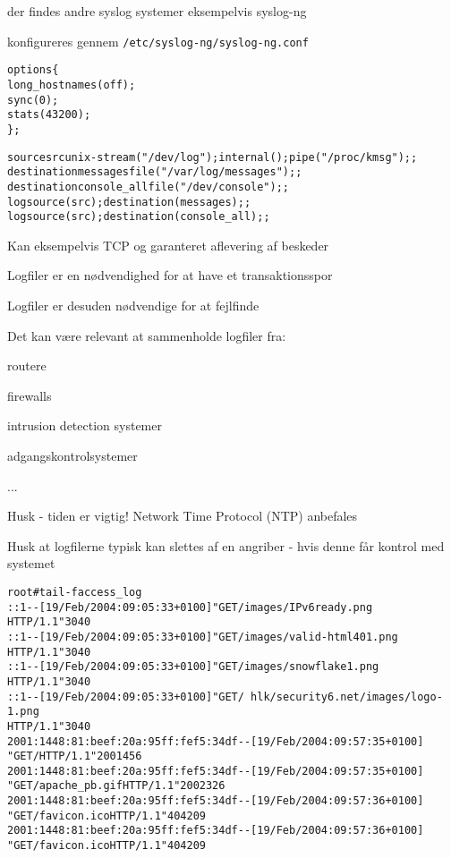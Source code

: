 \documentclass[Screen16to9,17pt]{foils}
\begin{document}

\begin{list2}
\item der findes andre syslog systemer eksempelvis syslog-ng
\item konfigureres gennem \verb+/etc/syslog-ng/syslog-ng.conf+
\end{list2}

\begin{alltt}
\small
options \{
        long_hostnames(off);
        sync(0);
        stats(43200);
\};

source src { unix-stream("/dev/log"); internal(); pipe("/proc/kmsg"); };
destination messages { file("/var/log/messages"); };
destination console_all { file("/dev/console"); };
log { source(src); destination(messages); };
log { source(src); destination(console_all); };
\end{alltt}
Kan eksempelvis TCP og garanteret aflevering af beskeder



\begin{list1}
\item Logfiler er en nødvendighed for at have et transaktionsspor
\item Logfiler er desuden nødvendige for at fejlfinde
\item Det kan være relevant at sammenholde logfiler fra:
\begin{list2}
\item routere
\item firewalls
\item intrusion detection systemer
\item adgangskontrolsystemer
\item ...
\end{list2}
\item Husk - tiden er vigtig! Network Time Protocol (NTP) anbefales
\item Husk at logfilerne typisk kan slettes af en angriber -
  hvis denne får kontrol med systemet
\end{list1}



\begin{alltt}
\footnotesize
root# tail -f access_log
::1 - - [19/Feb/2004:09:05:33 +0100] "GET /images/IPv6ready.png
HTTP/1.1" 304 0
::1 - - [19/Feb/2004:09:05:33 +0100] "GET /images/valid-html401.png
HTTP/1.1" 304 0
::1 - - [19/Feb/2004:09:05:33 +0100] "GET /images/snowflake1.png
HTTP/1.1" 304 0
::1 - - [19/Feb/2004:09:05:33 +0100] "GET /~hlk/security6.net/images/logo-1.png
HTTP/1.1" 304 0
2001:1448:81:beef:20a:95ff:fef5:34df - - [19/Feb/2004:09:57:35 +0100]
"GET / HTTP/1.1" 200 1456
2001:1448:81:beef:20a:95ff:fef5:34df - - [19/Feb/2004:09:57:35 +0100]
"GET /apache_pb.gif HTTP/1.1" 200 2326
2001:1448:81:beef:20a:95ff:fef5:34df - - [19/Feb/2004:09:57:36 +0100]
"GET /favicon.ico HTTP/1.1" 404 209
2001:1448:81:beef:20a:95ff:fef5:34df - - [19/Feb/2004:09:57:36 +0100]
"GET /favicon.ico HTTP/1.1" 404 209
\end{alltt}
\vskip 1cm
\end{document}
